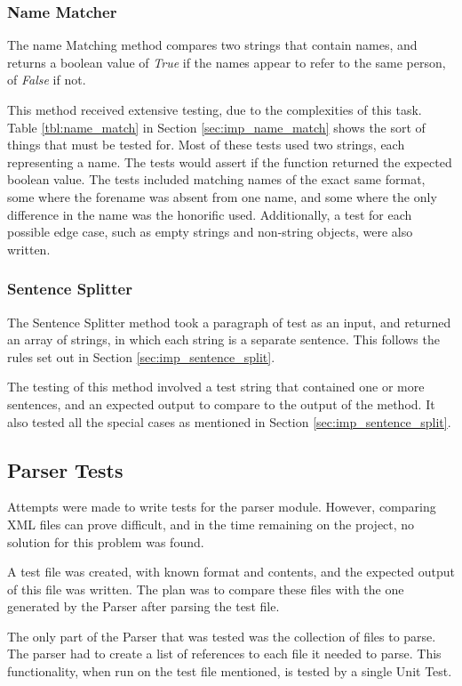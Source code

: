 \subsubsection{Name Matcher}

The name Matching method compares two strings that contain names, and returns a boolean value of \emph{True} if the names appear to refer to the same person, of \emph{False} if not.

This method received extensive testing, due to the complexities of this task. Table \ref{tbl:name_match} in Section \ref{sec:imp_name_match} shows the sort of things that must be tested for. 
Most of these tests used two strings, each representing a name. The tests would assert if the function returned the expected boolean value. The tests included matching names of the exact same format, some where the forename was absent from one name, and some where the only difference in the name was the honorific used. Additionally, a test for each possible edge case, such as empty strings and non-string objects, were also written.

\subsubsection{Sentence Splitter}
The Sentence Splitter method took a paragraph of test as an input, and returned an array of strings, in which each string is a separate sentence. This follows the rules set out in Section \ref{sec:imp_sentence_split}.

The testing of this method involved a test string that contained one or more sentences, and an expected output to compare to the output of the method. It also tested all the special cases as mentioned in Section \ref{sec:imp_sentence_split}.

\subsection{Parser Tests}

Attempts were made to write tests for the parser module. However, comparing XML files can prove difficult, and in the time remaining on the project, no solution for this problem was found.

A test file was created, with known format and contents, and the expected output of this file was written. The plan was to compare these files with the one generated by the Parser after parsing the test file.

The only part of the Parser that was tested was the collection of files to parse. The parser had to create a list of references to each file it needed to parse. This functionality, when run on the test file mentioned, is tested by a single Unit Test.

